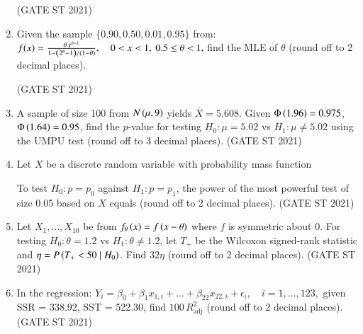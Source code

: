 \documentclass[journal,12pt,onecolumn]{IEEEtran}
\theoremstyle{remark}
\begin{document}
\begin{enumerate}
\hfill (GATE ST 2021) \\

\item
Given the sample $\{0.90, 0.50, 0.01, 0.95 \}$ from:
$
f(x) = \frac{\theta\, x^{\theta - 1}}{1 - \left(2^{\theta} - 1\right)/\left(1- \theta\right)}, \quad 0 < x < 1, \ 0.5 \le \theta < 1,
$
find the MLE of $\theta$ (round off to 2 decimal places).

\hfill (GATE ST 2021) \\
\item
A sample of size $100$ from $N\left(\mu,9\right)$ yields $\bar{X} = 5.608$.  
Given $\Phi\left(1.96\right)= 0.975$, $\Phi\left(1.64\right) = 0.95$,  
find the $p$-value for testing $H_0: \mu = 5.02$ vs $H_1: \mu \neq 5.02$ using the UMPU test  
(round off to 3 decimal places).
\hfill (GATE ST 2021) \\
\item
Let $X$ be a discrete random variable with probability mass function

  \bigskip

To test $H_0: p = p_0$ against $H_1: p = p_1$, the power of the most powerful test of size 0.05 based on $X$ equals (round off to 2 decimal places).
\hfill (GATE ST 2021) \\
\item
Let $X_1,\dots,X_{10}$ be from $f_\theta\left(x\right) = f\left(x-\theta\right)$ where $f$ is symmetric about $0$.  
For testing $H_0: \theta = 1.2$ vs $H_1: \theta \neq 1.2$,  
let $T_+$ be the Wilcoxon signed-rank statistic and $\eta = P\left(T_+ < 50 \mid H_0\right)$.  
Find $32 \eta$ (round off to 2 decimal places).
\hfill (GATE ST 2021) \\
\item
In the regression:
$
Y_i = \beta_0 + \beta_1 x_{1,i} + \dots + \beta_{22} x_{22,i} + \epsilon_i, \quad i=1,\dots,123,
$
given SSR = 338.92, SST = 522.30,  
find $100\, R_{\text{adj}}^2$ (round off to 2 decimal places).
\hfill (GATE ST 2021) \\
\end{enumerate}
\end{document}
